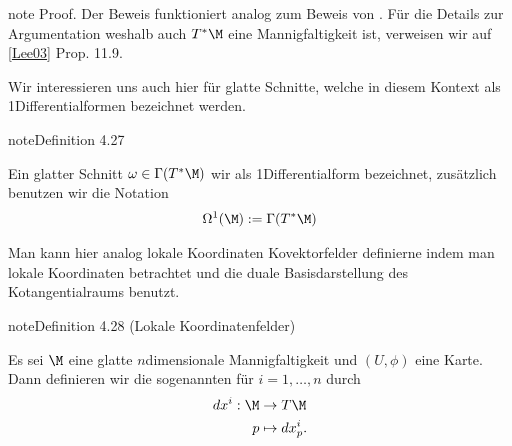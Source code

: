 \documentclass[letterpaper,10pt,english]{jupyterBook}
\begin{document}
\begin{sphinxadmonition}{note}
\sphinxAtStartPar
Proof. Der Beweis funktioniert analog zum Beweis von {\hyperref[\detokenize{manifolds/tangential:lem:tanbundle}]{}}. Für die Details zur Argumentation weshalb auch \(T^\ast\M\) eine Mannigfaltigkeit ist, verweisen wir auf {[}\hyperlink{cite.references:id15}{Lee03}{]} Prop. 11.9.
\end{sphinxadmonition}

\sphinxAtStartPar
Wir interessieren uns auch hier für glatte Schnitte, welche in diesem Kontext als 1\sphinxhyphen{}Differentialformen bezeichnet werden.
\label{manifolds/tangential:definition-37}
\begin{sphinxadmonition}{note}{Definition 4.27}



\sphinxAtStartPar
Ein glatter Schnitt \(\omega\in\Gamma(T^\ast\M)\) wir als 1\sphinxhyphen{}Differentialform bezeichnet, zusätzlich benutzen wir die Notation
\begin{equation*}
\begin{split}\Omega^1(\M) := \Gamma(T^\ast\M)\end{split}
\end{equation*}\end{sphinxadmonition}

\sphinxAtStartPar
Man kann hier analog lokale Koordinaten Kovektorfelder definierne indem man lokale Koordinaten betrachtet und die duale Basisdarstellung des Kotangentialraums benutzt.
\label{manifolds/tangential:definition-38}
\begin{sphinxadmonition}{note}{Definition 4.28 (Lokale Koordinatenfelder)}



\sphinxAtStartPar
Es sei \(\M\) eine glatte \(n\)\sphinxhyphen{}dimensionale Mannigfaltigkeit und \((U,\phi)\) eine Karte.
Dann definieren wir die sogenannten  für \(i=1,\ldots,n\) durch
\begin{equation*}
\begin{split}dx^{i}:\M&\to T\M\\
p&\mapsto dx^{i}_p. \end{split}
\end{equation*}\end{sphinxadmonition}
\end{document}
